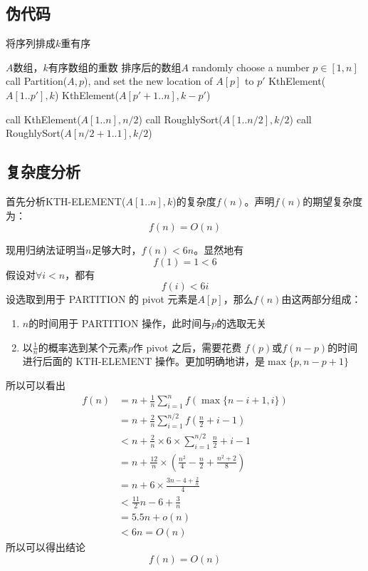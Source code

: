 \documentclass[UTF8]{ctexart}
\begin{document}
\subsection*{伪代码}
\begin{algorithm}
    \caption{将序列排成$k$重有序}
    \begin{algorithmic}[1]
        \Require $A$数组，$k$有序数组的重数
        \Ensure 排序后的数组$A$
            \State randomly choose a number $p \in [1, n]$
            \State call Partition($A, p$), and set the new location of $A[p]$ to $p'$
                \State KthElement($A[1..p'], k$)
            \Else
                \State KthElement($A[p'+1..n], k-p'$)
            \EndIf
        \EndFunction

                \State \Return
            \Else
                \State call KthElement($A[1..n], n/2$)
                \State call RoughlySort($A[1..n/2], k/2$)
                \State call RoughlySort($A[n/2+1..1], k/2$)
            \EndIf
        \EndFunction
    \end{algorithmic}
\end{algorithm}

\subsection*{复杂度分析}
首先分析KTH-ELEMENT($A[1..n], k$)的复杂度$f(n)$。声明$f(n)$的期望复杂度为：
$$f(n) = O(n)$$

现用归纳法证明当$n$足够大时，$f(n) < 6n$。显然地有
$$f(1) = 1 < 6$$
假设对$\forall i < n$，都有
$$f(i) < 6i$$
设选取到用于 PARTITION 的 pivot 元素是$A[p]$，那么$f(n)$由这两部分组成：
\begin{enumerate}
    \item $n$的时间用于 PARTITION 操作，此时间与$p$的选取无关
    \item 以$\frac{1}{n}$的概率选到某个元素$p$作 pivot 之后，需要花费 $f(p)$或$f(n-p)$的时间进行后面的 KTH-ELEMENT 操作。更加明确地讲，是$\max\{p, n-p+1\}$
\end{enumerate}
所以可以看出
\begin{align*}
    f(n) 
    &= n + \frac{1}{n}\sum_{i=1}^{n}{f\left(\max\{n-i+1, i\}\right)} \\   
    &= n + \frac{2}{n}\sum_{i=1}^{n/2}{f\left(\frac{n}{2}+i-1\right)} \\
    &< n + \frac{2}{n}\times 6\times \sum_{i=1}^{n/2}{\frac{n}{2}+i-1} \\
    &= n + \frac{12}{n}\times\left(\frac{n^2}{4}-\frac{n}{2}+\frac{n^2+2}{8}\right) \\
    &= n + 6\times\frac{3n-4+\frac{2}{n}}{4} \\
    &< \frac{11}{2}n-6+\frac{3}{n} \\
    &= 5.5n + o(n) \\
    &< 6n = O(n)
\end{align*}
所以可以得出结论
$$f(n) = O(n)$$
\end{document}
